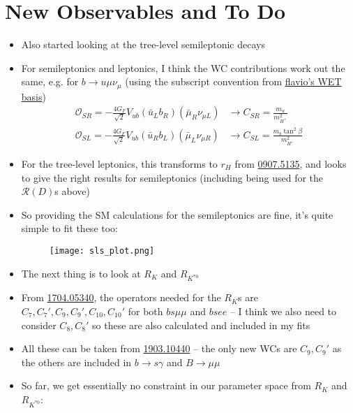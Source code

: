 \documentclass[11pt]{article}
\begin{document}
\section{New Observables and To Do}
\begin{itemize}
    \item Also started looking at the tree-level semileptonic decays 
    \item For semileptonics and leptonics, I think the WC contributions work out the same, e.g. for $b\to u\mu\nu_\mu$ (using the subscript convention from \href{https://wcxf.github.io/assets/pdf/WET.flavio.pdf}{flavio's WET basis})
        \begin{align*}
            \mathcal{O}_{SR} = -\frac{4G_F}{\sqrt{2}}V_{ub}(\bar{u}_Lb_R)(\bar{\mu}_R\nu_{\mu L}) &\to C_{SR} = \frac{m_u}{m_{H^+}^2} \\
            \mathcal{O}_{SL} = -\frac{4G_F}{\sqrt{2}}V_{ub}(\bar{u}_Rb_L)(\bar{\mu}_L\nu_{\mu R}) &\to C_{SL} = \frac{m_b\tan^2\beta}{m_{H^+}^2} 
        \end{align*}
    \item For the tree-level leptonics, this transforms to $r_H$ from \href{https://arxiv.org/pdf/0907.5135.pdf}{0907.5135}, and looks to give the right results for semileptonics (including being used for the $\mathcal{R}(D)$s above) 
    \item So providing the SM calculations for the semileptonics are fine, it's quite simple to fit these too:
        \begin{figure}[H]
            \centering
            \texttt{[image: sls\_plot.png]}
        \end{figure}
    \item The next thing is to look at $R_K$ and $R_{K^{*0}}$ 
    \item From \href{https://arxiv.org/pdf/1704.05340.pdf}{1704.05340}, the operators needed for the $R_K$s are $C_7,C_7',C_9,C_9',C_{10},C_{10}'$ for both $bs\mu\mu$ and $bsee$ -- I think we also need to consider $C_8,C_8'$ so these are also calculated and included in my fits 
    \item All these can be taken from \href{https://arxiv.org/pdf/1903.10440.pdf}{1903.10440} -- the only new WCs are $C_9,C_9'$ as the others are included in $b\to s\gamma$ and $B\to\mu\mu$
    \item So far, we get essentially no constraint in our parameter space from $R_K$ and $R_{K^{*0}}$:
        \begin{figure}[H]
            \centering

\end{figure}
\end{itemize}
\end{document}
